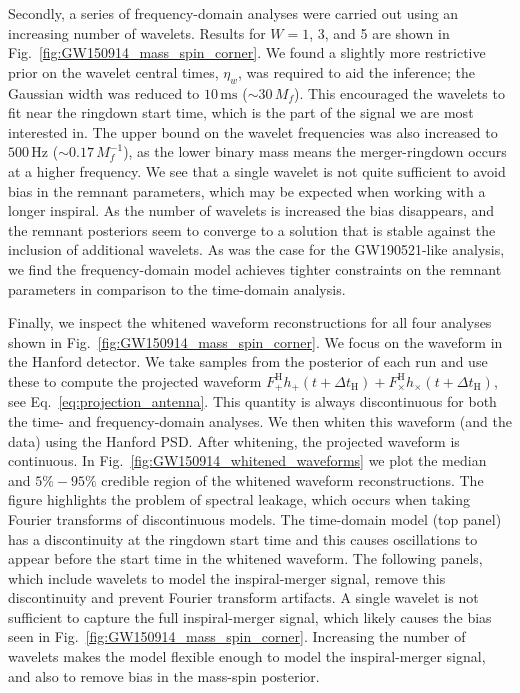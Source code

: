 Secondly, a series of frequency-domain analyses were carried out using an increasing number of wavelets.
Results for $W=1$, 3, and 5 are shown in Fig.~\ref{fig:GW150914_mass_spin_corner}.
We found a slightly more restrictive prior on the wavelet central times, $\eta_w$, was required to aid the inference; the Gaussian width was reduced to $10\,\mathrm{ms}$ ($\sim 30\,M_f$).
This encouraged the wavelets to fit near the ringdown start time, which is the part of the signal we are most interested in.
The upper bound on the wavelet frequencies was also increased to $500\,\mathrm{Hz}$ ($\sim 0.17\,M_f^{-1}$), as the lower binary mass means the merger-ringdown occurs at a higher frequency.
We see that a single wavelet is not quite sufficient to avoid bias in the remnant parameters, which may be expected when working with a longer inspiral.
As the number of wavelets is increased the bias disappears, and the remnant posteriors seem to converge to a solution that is stable against the inclusion of additional wavelets. 
As was the case for the GW190521-like analysis, we find the frequency-domain model achieves tighter constraints on the remnant parameters in comparison to the time-domain analysis. 

Finally, we inspect the whitened waveform reconstructions for all four analyses shown in Fig.~\ref{fig:GW150914_mass_spin_corner}.
We focus on the waveform in the Hanford detector.
We take samples from the posterior of each run and use these to compute the projected waveform $F^\mathrm{H}_{+} h_+(t+\Delta t_\mathrm{H})+F^\mathrm{H}_{\times} h_\times(t+\Delta t_\mathrm{H})$, see Eq.~\ref{eq:projection_antenna}. This quantity is always discontinuous for both the time- and frequency-domain analyses.
We then whiten this waveform (and the data) using the Hanford PSD. After whitening, the projected waveform is continuous.
In Fig.~\ref{fig:GW150914_whitened_waveforms} we plot the median and $5\%-95\%$ credible region of the whitened waveform reconstructions.
The figure highlights the problem of spectral leakage, which occurs when taking Fourier transforms of discontinuous models. 
The time-domain model (top panel) has a discontinuity at the ringdown start time and this causes oscillations to appear before the start time in the whitened waveform.
The following panels, which include wavelets to model the inspiral-merger signal, remove this discontinuity and prevent Fourier transform artifacts.
A single wavelet is not sufficient to capture the full inspiral-merger signal, which likely causes the bias seen in Fig.~\ref{fig:GW150914_mass_spin_corner}. 
Increasing the number of wavelets makes the model flexible enough to model the inspiral-merger signal, and also to remove bias in the mass-spin posterior.



